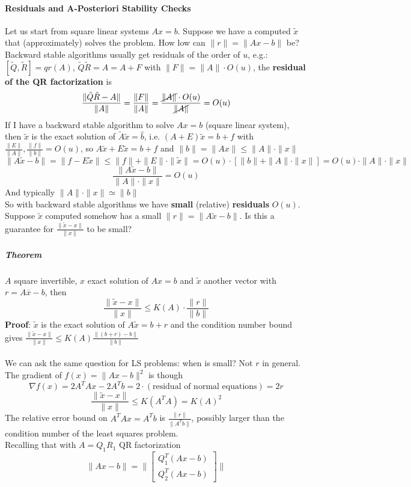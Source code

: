 \documentclass[10pt]{report}
\begin{document}
\paragraph{Residuals and A-Posteriori Stability Checks} Let us start from square linear systems $Ax=b$. Suppose we have a computed $\tilde{x}$ that (approximately) solves the problem. How low can $\|r\| = \|Ax-b\|$ be?\\ Backward stable algorithms usually get residuals of the order of $u$, e.g.: $[\tilde{Q},\tilde{R}]=qr(A)$, $\tilde{Q}\tilde{R}=\hat{A}=A+F$ with $\|F\|=\|A\|\cdot O(u)$, the \textbf{residual of the QR factorization} is $$\frac{\|\tilde{Q}\tilde{R}-A\|}{\|A\|}=\frac{\|F\|}{\|A\|} = \frac{\cancel{\|A\|}\cdot O(u)}{\cancel{\|A\|}} = O(u)$$
If I have a backward stable algorithm to solve $Ax=b$ (square linear system), then $\tilde{x}$ is the exact solution of $\tilde{A}\tilde{x}=\hat{b}$, i.e. $(A+E)\tilde{x}=b+f$ with $\frac{\|E\|}{\|A\|},\frac{\|f\|}{\|b\|} = O(u)$, so $A\tilde{x}+E\tilde{x}=b+f$ and $\|b\| = \|Ax\| \leq \|A\|\cdot\|x\|$
$$\|A\tilde{x}-b\|=\|f-E\tilde{x}\|\leq \|f\|+\|E\|\cdot\|\tilde{x}\|=O(u)\cdot[\|b\|+\|A\|\cdot\|x\|]=O(u)\cdot\|A\|\cdot\|x\|$$
$$\frac{\|A\tilde{x}-b\|}{\|A\|\cdot\|x\|}=O(u)$$
And typically $\|A\|\cdot\|x\|\simeq \|b\|$\\
So with backward stable algorithms we have \textbf{small} (relative) \textbf{residuals} $O(u)$.\\
Suppose $\tilde{x}$ computed somehow has a small $\|r\|=\|A\tilde{x}-b\|$. Is this a guarantee for $\frac{\|\tilde{x}-x\|}{\|x\|}$ to be small?
\subparagraph{Theorem} $A$ square invertible, $x$ exact solution of $Ax = b$ and $\tilde{x}$ another vector with $r = A\overline{x}-b$, then $$\frac{\|\tilde{x}-x\|}{\|x\|}\leq K(A)\cdot\frac{\|r\|}{\|b\|}$$
\textbf{Proof}: $\tilde{x}$ is the exact solution of $A\tilde{x}=b+r$ and the condition number bound gives $\frac{\|\tilde{x}-x\|}{\|x\|}\leq K(A)\frac{\|(b+r)-b\|}{\|b\|}$\\\\
We can ask the same question for LS problems: when is small? Not $r$ in general. The gradient of $f(x) = \|Ax-b\|^2$ is though 
$$\nabla f(x) = 2A^TAx-2A^Tb = 2\cdot(\text{residual of normal equations}) = 2r$$
$$\frac{\|\tilde{x}-x\|}{\|x\|}\leq K(A^TA) = K(A)^2$$
The relative error bound on $A^TAx=A^Tb$ is $\frac{\|r\|}{\|A^Tb\|}$, possibly larger than the condition number of the least squares problem.\\
Recalling that with $A=Q_1R_1$ QR factorization $$\|Ax-b\|=\|\left[\begin{array}{c}
Q_1^T(Ax-b)\\Q_2^T(Ax-b)
\end{array}\right]\|$$
\end{document}
